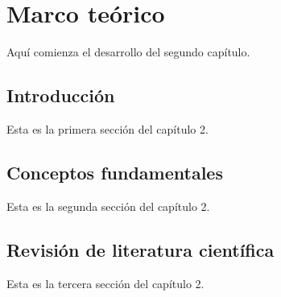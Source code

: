 \chapter{Marco teórico}

Aquí comienza el desarrollo del segundo capítulo.

\section{Introducción}
Esta es la primera sección del capítulo 2.

\section{Conceptos fundamentales}
Esta es la segunda sección del capítulo 2.

\section{Revisión de literatura científica}
Esta es la tercera sección del capítulo 2.